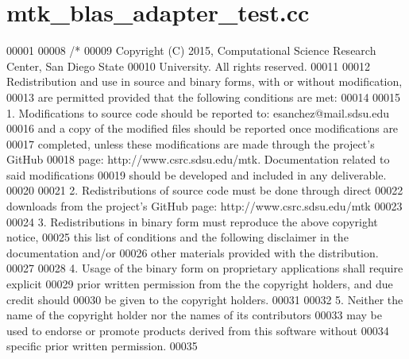 \hypertarget{mtk__blas__adapter__test_8cc_source}{\section{mtk\+\_\+blas\+\_\+adapter\+\_\+test.\+cc}
\label{mtk__blas__adapter__test_8cc_source}
}

\begin{DoxyCode}
00001 
00008 \textcolor{comment}{/*}
00009 \textcolor{comment}{Copyright (C) 2015, Computational Science Research Center, San Diego State}
00010 \textcolor{comment}{University. All rights reserved.}
00011 \textcolor{comment}{}
00012 \textcolor{comment}{Redistribution and use in source and binary forms, with or without modification,}
00013 \textcolor{comment}{are permitted provided that the following conditions are met:}
00014 \textcolor{comment}{}
00015 \textcolor{comment}{1. Modifications to source code should be reported to: esanchez@mail.sdsu.edu}
00016 \textcolor{comment}{and a copy of the modified files should be reported once modifications are}
00017 \textcolor{comment}{completed, unless these modifications are made through the project's GitHub}
00018 \textcolor{comment}{page: http://www.csrc.sdsu.edu/mtk. Documentation related to said modifications}
00019 \textcolor{comment}{should be developed and included in any deliverable.}
00020 \textcolor{comment}{}
00021 \textcolor{comment}{2. Redistributions of source code must be done through direct}
00022 \textcolor{comment}{downloads from the project's GitHub page: http://www.csrc.sdsu.edu/mtk}
00023 \textcolor{comment}{}
00024 \textcolor{comment}{3. Redistributions in binary form must reproduce the above copyright notice,}
00025 \textcolor{comment}{this list of conditions and the following disclaimer in the documentation and/or}
00026 \textcolor{comment}{other materials provided with the distribution.}
00027 \textcolor{comment}{}
00028 \textcolor{comment}{4. Usage of the binary form on proprietary applications shall require explicit}
00029 \textcolor{comment}{prior written permission from the the copyright holders, and due credit should}
00030 \textcolor{comment}{be given to the copyright holders.}
00031 \textcolor{comment}{}
00032 \textcolor{comment}{5. Neither the name of the copyright holder nor the names of its contributors}
00033 \textcolor{comment}{may be used to endorse or promote products derived from this software without}
00034 \textcolor{comment}{specific prior written permission.}
00035 \textcolor{comment}{}

\end{DoxyCode}
